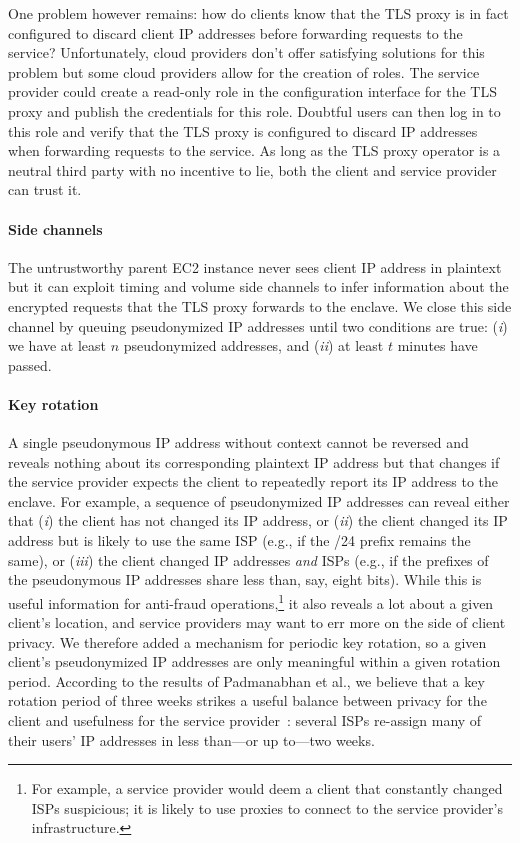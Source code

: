 One problem however remains: how do clients know that the TLS proxy is in fact
configured to discard client IP addresses before forwarding requests to the
service?  Unfortunately, cloud providers don't offer satisfying solutions for
this problem but some cloud providers allow for the creation of roles.  The
service provider could create a read-only role in the configuration interface
for the TLS proxy and publish the credentials for this role.  Doubtful users can
then log in to this role and verify that the TLS proxy is configured to discard
IP addresses when forwarding requests to the service.  As long as the TLS proxy
operator is a neutral third party with no incentive to lie, both the client and
service provider can trust it.


\paragraph{Side channels}
The untrustworthy parent EC2 instance never sees client IP address in plaintext
but it can exploit timing and volume side channels to infer information about
the encrypted requests that the TLS proxy forwards to the enclave.  We close
this side channel by queuing pseudonymized IP addresses until two conditions are
true: (\emph{i}) we have at least $n$ pseudonymized addresses, and (\emph{ii})
at least $t$ minutes have passed.

\paragraph{Key rotation}
A single pseudonymous IP address without context cannot be reversed and reveals
nothing about its corresponding plaintext IP address but that changes if the
service provider expects the client to repeatedly report its IP address to the
enclave.  For example, a sequence of pseudonymized IP addresses can reveal
either that (\emph{i}) the client has not changed its IP address, or (\emph{ii})
the client changed its IP address but is likely to use the same ISP (e.g., if
the /24 prefix remains the same), or (\emph{iii}) the client changed IP
addresses \emph{and} ISPs (e.g., if the prefixes of the pseudonymous IP
addresses share less than, say, eight bits).  While this is useful information
for anti-fraud operations,\footnote{For example, a service provider would deem a
client that constantly changed ISPs suspicious; it is likely to use proxies to
connect to the service provider's infrastructure.} it also reveals a lot about a
given client's location, and service providers may want to err more on the side
of client privacy.  We therefore added a mechanism for periodic key rotation, so
a given client's pseudonymized IP addresses are only meaningful within a given
rotation period.  According to the results of Padmanabhan et al., we believe
that a key rotation period of three weeks strikes a useful balance between
privacy for the client and usefulness for the service
provider~\cite[\S~3.2]{Padmanabhan20a}: several ISPs re-assign many of their
users' IP addresses in less than---or up to---two weeks.

